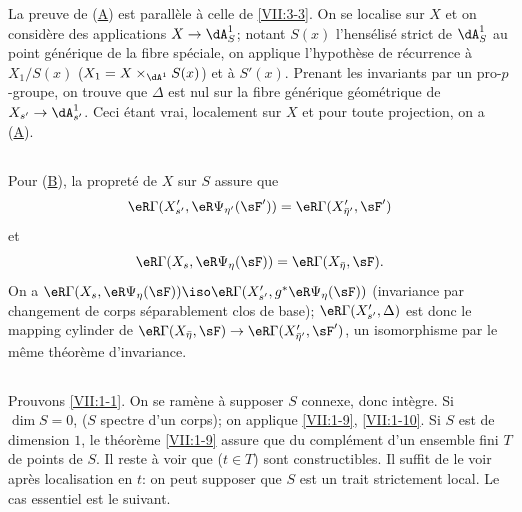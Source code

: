 La preuve de (\hyperlink{VII:3-A}{A}) est parallèle à celle de 
\ref{VII:3-3}. On se localise sur $X$ et on considère des applications 
$X\to \dA_S^1$; notant $S(x)$ l'hensélisé strict de $\dA_S^1$ au point 
générique de la fibre spéciale, on applique l'hypothèse de récurrence 
à $X_1/S(x)$ ($X_1=X\times_{\dA^1} S(x)$) et à $S'(x)$. Prenant les 
invariants par un pro-$p$-groupe, on trouve que $\Delta$ est nul sur la fibre 
générique géométrique de $X_{s'} \to \dA_{s'}^1$. Ceci étant vrai, 
localement sur $X$ et pour toute projection, on a (\hyperlink{VII:3-A}{A}). 





\subsection{}\label{VII:3-9}

Pour (\hyperlink{VII:3-B}{B}), la propreté de $X$ sur $S$ assure que 
\[
  \eR\Gamma(X_{s'}',\eR\Psi_{\eta'}(\sF')) = \eR\Gamma(X_{\bar\eta'}',\sF') 
\]
et
\[
  \eR\Gamma(X_s,\eR\Psi_\eta(\sF)) = \eR\Gamma(X_{\bar\eta},\sF) \text{.} 
\]
On a 
$\eR\Gamma(X_s,\eR\Psi_\eta(\sF))\iso \eR\Gamma(X_{s'}',g^\ast\eR\Psi_\eta(\sF))$
(invariance par changement de corps séparablement clos de base); 
$\eR\Gamma(X_{s'}', \Delta)$ est donc le mapping cylinder de 
$\eR\Gamma(X_{\bar\eta},\sF) \to \eR\Gamma(X_{\bar\eta'}',\sF')$, un 
isomorphisme par le même théorème d'invariance. 





\subsection{}\label{VII:3-10}

Prouvons \ref{VII:1-1}. On se ramène à supposer $S$ connexe, donc 
intègre. Si $\dim S=0$, ($S$ spectre d'un corps); on applique \ref{VII:1-9}, 
\ref{VII:1-10}. Si $S$ est de dimension $1$, le théorème \ref{VII:1-9} 
assure que  du complément 
d'un ensemble fini $T$ de points de $S$. Il reste à voir que  ($t\in T$) sont constructibles. Il suffit de le voir après 
localisation en $t$: on peut supposer que $S$ est un trait strictement local. 
Le cas essentiel est le suivant. 





